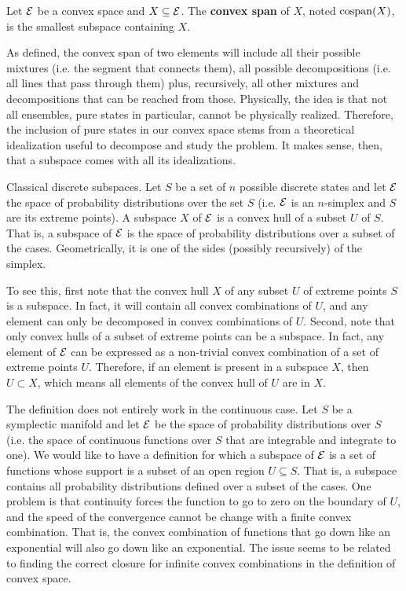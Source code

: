 \begin{defn}
	Let $\mathcal{E}$ be a convex space and $X \subseteq \mathcal{E}$.  The \textbf{convex span} of $X$, noted $\mathrm{cospan}(X)$, is the smallest subspace containing $X$.
\end{defn}

\begin{remark}
	As defined, the convex span of two elements will include all their possible mixtures (i.e. the segment that connects them), all possible decompositions (i.e. all lines that pass through them) plus, recursively, all other mixtures and decompositions that can be reached from those. Physically, the idea is that not all ensembles, pure states in particular, cannot be physically realized. Therefore, the inclusion of pure states in our convex space stems from a theoretical idealization useful to decompose and study the problem. It makes sense, then, that a subspace comes with all its idealizations.
\end{remark}

\begin{example} Classical discrete subspaces.
	Let $S$ be a set of $n$ possible discrete states and let $\mathcal{E}$ the space of probability distributions over the set $S$ (i.e. $\mathcal{E}$ is an $n$-simplex and $S$ are its extreme points). A subspace $X$ of $\mathcal{E}$ is a convex hull of a subset $U$ of $S$. That is, a subspace of $\mathcal{E}$ is the space of probability distributions over a subset of the cases. Geometrically, it is one of the sides (possibly recursively) of the simplex.
	
	To see this, first note that the convex hull $X$ of any subset $U$ of extreme points $S$ is a subspace. In fact, it will contain all convex combinations of $U$, and any element can only be decomposed in convex combinations of $U$. Second, note that only convex hulls of a subset of extreme points can be a subspace. In fact, any element of $\mathcal{E}$ can be expressed as a non-trivial convex combination of a set of extreme points $U$. Therefore, if an element is present in a subspace $X$, then $U \subset X$, which means all elements of the convex hull of $U$ are in $X$.
\end{example}

\begin{remark}
	The definition does not entirely work in the continuous case. Let $S$ be a symplectic manifold and let $\mathcal{E}$ be the space of probability distributions over $S$ (i.e. the space of continuous functions over $S$ that are integrable and integrate to one). We would like to have a definition for which a subspace of $\mathcal{E}$ is a set of functions whose support is a subset of an open region $U \subseteq S$. That is, a subspace contains all probability distributions defined over a subset of the cases. One problem is that continuity forces the function to go to zero on the boundary of $U$, and the speed of the convergence cannot be change with a finite convex combination. That is, the convex combination of functions that go down like an exponential will also go down like an exponential. The issue seems to be related to finding the correct closure for infinite convex combinations in the definition of convex space.
\end{remark}

